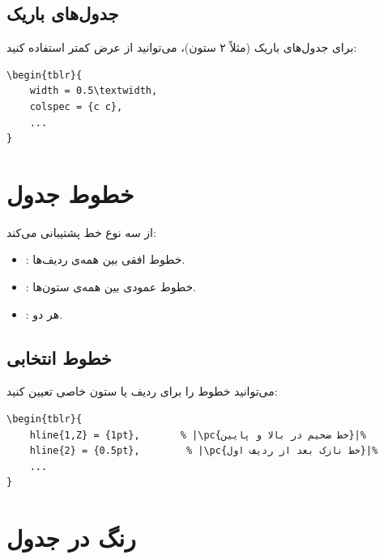 
\subsection{جدول‌های باریک}
\label{sec:tables-narrow}

برای جدول‌های باریک (مثلاً ۲ ستون)، می‌توانید
از عرض کمتر استفاده کنید:

\begin{latin}
\begin{verbatim}
\begin{tblr}{
    width = 0.5\textwidth,
    colspec = {c c},
    ...
}
\end{verbatim}
\end{latin}

\section{خطوط جدول}
\label{sec:tables-rules}

 از سه نوع خط پشتیبانی می‌کند:

\begin{itemize}
    \item {}: خطوط افقی بین همه‌ی
    ردیف‌ها.
    \item {}: خطوط عمودی بین همه‌ی
    ستون‌ها.
    \item {}: هر دو.
\end{itemize}

\subsection{خطوط انتخابی}
\label{sec:tables-selective-rules}

می‌توانید خطوط را برای ردیف یا ستون خاصی تعیین
کنید:

\begin{latin}
\begin{verbatim}
\begin{tblr}{
    hline{1,Z} = {1pt},       % |\pc{خط ضخیم در بالا و پایین}|%
    hline{2} = {0.5pt},        % |\pc{خط نازک بعد از ردیف اول}|%
    ...
}
\end{verbatim}
\end{latin}


\section{رنگ در جدول}
\label{sec:tables-color}

